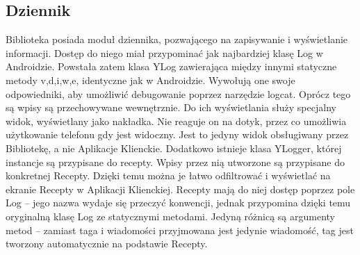 \documentclass[11pt,a4paper,polish,thesis]{dcsbook}
\begin{document}
\subsection{Dziennik}
Biblioteka posiada moduł dziennika, pozwającego na zapisywanie i wyświetlanie informacji. Dostęp do niego miał przypominać jak najbardziej klasę Log \cite{android.log} w Androidzie. Powstała zatem klasa YLog zawierająca między innymi statyczne metody v,d,i,w,e, identyczne jak w Androidzie. Wywołują one swoje odpowiedniki, aby umożliwić debugowanie poprzez narzędzie logcat. Oprócz tego są wpisy są przechowywane wewnętrznie.
Do ich wyświetlania służy specjalny widok, wyświetlany jako nakładka. Nie reaguje on na dotyk, przez co umożliwia użytkowanie telefonu gdy jest widoczny. Jest to jedyny widok obsługiwany przez Bibliotekę, a nie Aplikacje Klienckie.
Dodatkowo istnieje klasa YLogger, której instancje są przypisane do recepty. Wpisy przez nią utworzone są przypisane do konkretnej Recepty. Dzięki temu można je łatwo odfiltrować i wyświetlać na ekranie Recepty w Aplikacji Klienckiej. 
Recepty mają do niej dostęp poprzez pole Log -- jego nazwa wydaje się przeczyć konwencji, jednak przypomina dzięki temu oryginalną klasę Log ze statycznymi metodami. Jedyną różnicą są argumenty metod -- zamiast taga i wiadomości przyjmowana jest jedynie wiadomość, tag jest tworzony automatycznie na podstawie Recepty.
\end{document}

